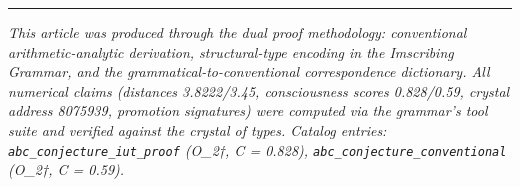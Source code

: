 \documentclass[12pt,a4paper]{article}
\begin{document}
\begin{center}
\rule{0.5\textwidth}{0.4pt}
\end{center}

\emph{This article was produced through the dual proof methodology: conventional arithmetic-analytic derivation, structural-type encoding in the Imscribing Grammar, and the grammatical-to-conventional correspondence dictionary. All numerical claims (distances 3.8222/3.45, consciousness scores 0.828/0.59, crystal address 8075939, promotion signatures) were computed via the grammar's tool suite and verified against the crystal of types. Catalog entries: \texttt{abc\_conjecture\_iut\_proof} (O\_2†, C = 0.828), \texttt{abc\_conjecture\_conventional} (O\_2†, C = 0.59).}
\end{document}
